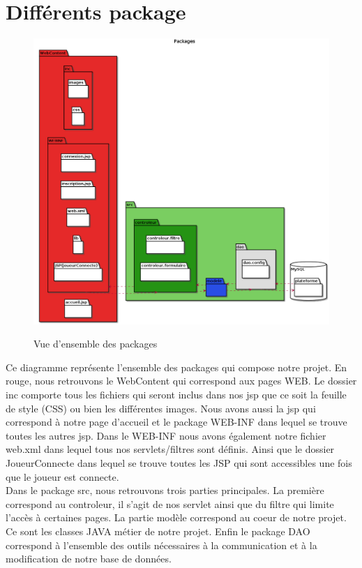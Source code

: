 \section{Différents package}

\begin{figure}[H]
  \center
  \includegraphics[scale=0.25]{../graph/packages.png} \\
  \caption{Vue d'ensemble des packages}
\end{figure}

Ce diagramme représente l'ensemble des packages qui compose notre projet. En rouge, nous retrouvons le WebContent qui correspond aux pages WEB. Le dossier inc comporte tous les fichiers qui seront inclus dans nos jsp que ce soit la feuille de style (CSS) ou bien les différentes images. Nous avons aussi la jsp qui correspond à notre page d’accueil et le package WEB-INF dans lequel se trouve toutes les autres jsp. Dans le WEB-INF nous avons également notre fichier web.xml dans lequel tous nos servlets/filtres sont définis. Ainsi que le dossier JoueurConnecte dans lequel se trouve toutes les JSP qui sont accessibles une fois que le joueur est connecte. \\

Dans le package src, nous retrouvons trois parties principales. La première correspond au controleur, il s'agit de nos servlet ainsi que du filtre qui limite l’accès à certaines pages. La partie modèle correspond au coeur de notre projet. Ce sont les classes JAVA métier de notre projet. Enfin le package DAO correspond à l'ensemble des outils nécessaires à la communication et à la modification de notre base de données. \\

